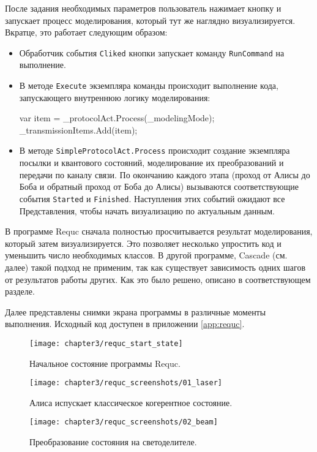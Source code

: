 После задания необходимых параметров пользователь нажимает кнопку и запускает процесс моделирования, который тут же наглядно визуализируется. 
Вкратце, это работает следующим образом:
\begin{itemize}
  \item Обработчик события \texttt{Cliked} кнопки запускает команду \texttt{RunCommand} на выполнение.
  \item В методе \texttt{Execute} экземпляра команды происходит выполнение кода, запускающего внутреннюю логику моделирования:
    \begin{csharpcode}
      var item = _protocolAct.Process(_modelingMode);
      _transmissionItems.Add(item);
    \end{csharpcode}
  \item В методе \texttt{SimpleProtocolAct.Process} происходит создание экземпляра посылки и квантового состояний, моделирование их преобразований и передачи по каналу связи. По окончанию каждого этапа (проход от Алисы до Боба и обратный проход от Боба до Алисы) вызываются соответствующие события \texttt{Started} и \texttt{Finished}. Наступления этих событий ожидают все Представления, чтобы начать визуализацию по актуальным данным.
\end{itemize}

В программе Requc сначала полностью просчитывается результат моделирования, который затем визуализируется. Это позволяет несколько упростить код и уменьшить число необходимых классов. В другой программе, Cascade (см. далее) такой подход не применим, так как существует зависимость одних шагов от результатов работы других. Как это было решено, описано в соответствующем разделе.

Далее представлены снимки экрана программы в различные моменты выполнения. Исходный код доступен в приложении \ref{app:requc}.
\begin{figure}[h]
  \texttt{[image: chapter3/requc\_start\_state]}
  \caption{Начальное состояние программы Requc.}
  \label{fig:requc_start_state}
\end{figure}

\begin{figure}[h]
  \texttt{[image: chapter3/requc\_screenshots/01\_laser]}
  \caption{Алиса испускает классическое когерентное состояние.}
\end{figure}

\begin{figure}[h]
  \texttt{[image: chapter3/requc\_screenshots/02\_beam]}
  \caption{Преобразование состояния на светоделителе.}
\end{figure}

